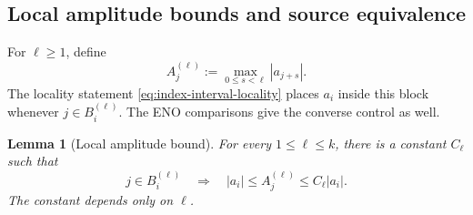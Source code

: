 \documentclass[11pt]{amsart}
\theoremstyle{plain}
\newtheorem{lemma}[theorem]{Lemma}
\theoremstyle{definition}
\theoremstyle{remark}
\numberwithin{equation}{section}
\theoremstyle{plain}
\begin{document}
\subsection{Local amplitude bounds and source equivalence}
\label{sec:local-amplitude-source}

For $\ell\ge1$, define
\begin{equation}\label{eq:local-block-amplitude}
	A_j^{(\ell)}:=\max_{0\le s<\ell}|a_{j+s}|.
\end{equation}
The locality statement \eqref{eq:index-interval-locality} places $a_i$ inside
this block whenever $j\in B_i^{(\ell)}$.  The ENO comparisons give the
converse control as well.

\begin{lemma}[Local amplitude bound]
	\label{lem:local-amplitude}
	For every $1\le\ell\le k$, there is a constant $C_\ell$ such that
	\begin{equation}\label{eq:two-sided-local-amplitude}
		j\in B_i^{(\ell)}
		\quad\Longrightarrow\quad
		|a_i|\le A_j^{(\ell)}\le C_\ell|a_i|.
	\end{equation}
	The constant depends only on $\ell$.
\end{lemma}
\end{document}
